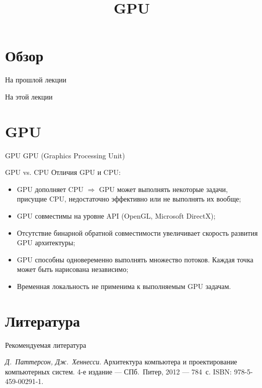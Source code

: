 

\title{GPU}



\begin{frame}
\titlepage
\end{frame}

\section*{Обзор}

\begin{frame}{На прошлой лекции}
\end{frame}

\begin{frame}{На этой лекции}
\tableofcontents
\end{frame}

\section{GPU}

\begin{frame}{GPU}
GPU (\abbr Graphics Processing Unit)
\end{frame}

\begin{frame}{GPU vs. CPU}
Отличия GPU и CPU:
\begin{itemize}
    \item GPU дополняет CPU $\Rightarrow$ GPU может выполнять некоторые задачи,
    присущие CPU, недостаточно эффективно или не выполнять их вообще;
    \item GPU совместимы на уровне API (OpenGL, Microsoft DirectX);
    \item Отсутствие бинарной обратной совместимости увеличивает скорость
    развития GPU архитектуры;
    \item GPU способны одновеременно выполнять множество потоков. Каждая точка
    может быть нарисована независимо;
    \item Временная локальность не применима к выполняемым GPU задачам.
\end{itemize}
\end{frame}

\section*{Литература}

\begin{frame}{Рекомендуемая литература}
\begin{thebibliography}{99}
    \bibitem{} \textit{Д.~Паттерсон, Дж.~Хеннесси}. Архитектура компьютера и
    проектирование компьютерных систем. 4-е издание --- СПб.~Питер, 2012 ---
    784~с. ISBN: 978-5-459-00291-1.
\end{thebibliography}
\end{frame}

